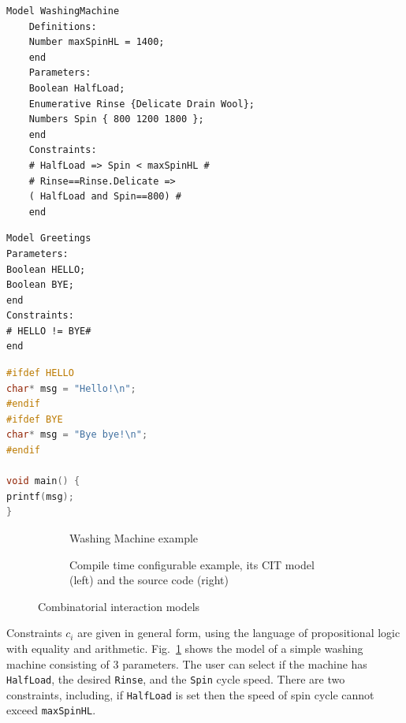 \begin{tikzborder}{\cite{Gargantini16:validation}}
\newsavebox{\wmlisting}
\begin{lrbox}{\wmlisting}%
	\begin{lstlisting}[language=comb,basicstyle=\sffamily\scriptsize,frame=none]
	Model WashingMachine
	Definitions:
	Number maxSpinHL = 1400;
	end
	Parameters:
	Boolean HalfLoad;
	Enumerative Rinse {Delicate Drain Wool};
	Numbers Spin { 800 1200 1800 };
	end
	Constraints:
	# HalfLoad => Spin < maxSpinHL #
	# Rinse==Rinse.Delicate => 
	( HalfLoad and Spin==800) #
	end\end{lstlisting}
\end{lrbox}
	
\newsavebox{\hello}
\begin{lrbox}{\hello}%
\begin{lstlisting}[language=comb,basicstyle=\sffamily\scriptsize,frame=none]
Model Greetings
Parameters:
Boolean HELLO;
Boolean BYE;
end
Constraints:
# HELLO != BYE#
end
\end{lstlisting}\qquad
\begin{lstlisting}[language=C,basicstyle=\scriptsize,columns=fullflexible,frame=none]
#ifdef HELLO
char* msg = "Hello!\n";
#endif
#ifdef BYE
char* msg = "Bye bye!\n";
#endif

void main() {
printf(msg);
}
\end{lstlisting}
\end{lrbox}
	
	
	\begin{figure}[!htp]%
		\centering
			\begin{subfigure}[b]{0.49\textwidth}
			\usebox{\wmlisting}
			\caption{Washing Machine example}\label{fig:validation_washerexample}
		\end{subfigure}
		\begin{subfigure}[b]{0.49\textwidth}
			\centering
			\usebox{\hello}
			\caption{Compile time configurable example, its CIT model (left) and the source code (right)}\label{fig:compiletimeConf}
		\end{subfigure}
		\caption{Combinatorial interaction \citlab{} models}%
	\end{figure}
	
	\bb Constraints $c_i$ are given in general form, using the language of propositional logic with equality and arithmetic. 
	Fig.~\ref{fig:validation_washerexample} shows the \citlab{} model
	of a simple washing machine consisting of 3 parameters. The user can select if the machine has \texttt{HalfLoad}, the desired \texttt{Rinse}, and the \texttt{Spin} cycle speed.
	There are two constraints, including,  if \texttt{HalfLoad} is set then the speed of spin cycle cannot exceed \texttt{maxSpinHL}.
	

\end{tikzborder}
